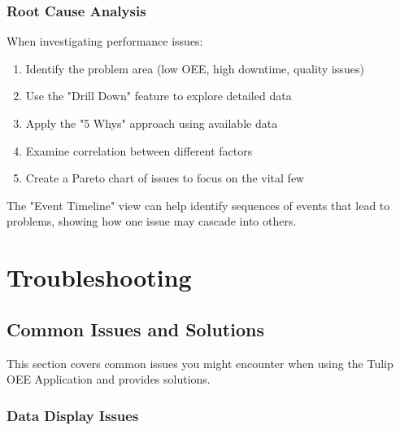 \documentclass[12pt,a4paper]{report}
\newenvironment{tip}
  {\begin{tcolorbox}[colback=tuliplightgray,colframe=tulipgreen,title=Tip]}
  {\end{tcolorbox}}
\begin{document}
\subsection{Root Cause Analysis}

When investigating performance issues:

\begin{enumerate}
    \item Identify the problem area (low OEE, high downtime, quality issues)
    \item Use the "Drill Down" feature to explore detailed data
    \item Apply the "5 Whys" approach using available data
    \item Examine correlation between different factors
    \item Create a Pareto chart of issues to focus on the vital few
\end{enumerate}

\begin{tip}
The "Event Timeline" view can help identify sequences of events that lead to problems, showing how one issue may cascade into others.
\end{tip}

\chapter{Troubleshooting}

\section{Common Issues and Solutions}

This section covers common issues you might encounter when using the Tulip OEE Application and provides solutions.

\subsection{Data Display Issues}
\end{document}
